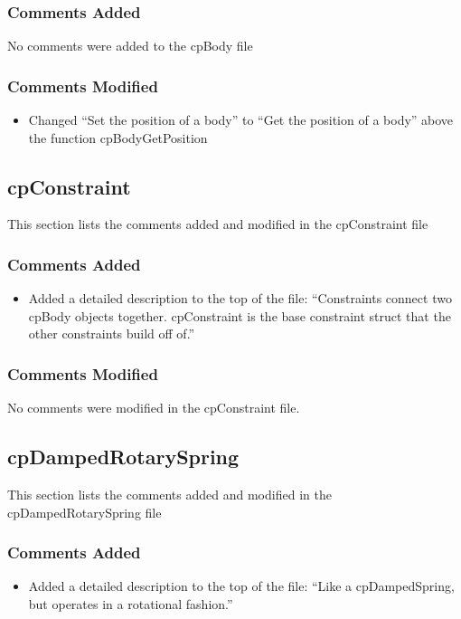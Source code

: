 \documentclass[12pt]{article}
\begin{document}
\subsubsection{Comments Added}
No comments were added to the cpBody file

\subsubsection{Comments Modified}

\begin{itemize}
\item Changed  ``Set the position of a body'' to ``Get the position of a body'' above the function  cpBodyGetPosition
\end{itemize}


\subsection{cpConstraint} 
This section lists the comments added and modified  in the cpConstraint file

\subsubsection{Comments Added}

\begin{itemize}
\item Added a detailed description to the top of the file:   ``Constraints connect two cpBody objects together. cpConstraint is the base constraint struct that the other constraints build off of.''
\end{itemize}

\subsubsection{Comments Modified}
No comments were modified in the cpConstraint file.

\subsection{cpDampedRotarySpring} 
This section lists the comments added and modified  in the cpDampedRotarySpring file

\subsubsection{Comments Added}
\begin{itemize}
\item Added a detailed description to the top of the file:  ``Like a cpDampedSpring, but operates in a rotational fashion.''
\end{itemize}
\end{document}
